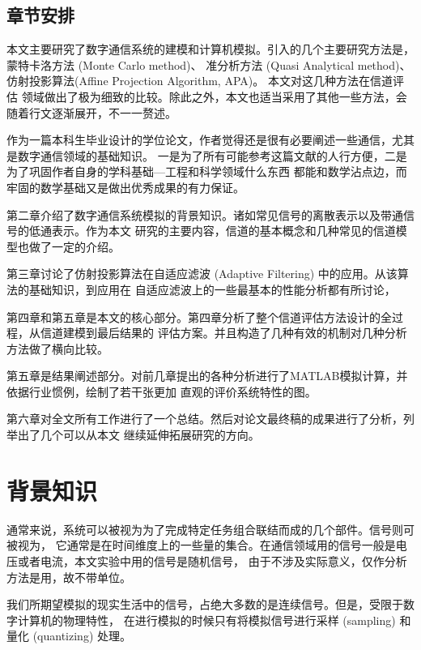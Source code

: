 \section{章节安排}\label{ChapterArrangement}
本文主要研究了数字通信系统的建模和计算机模拟。引入的几个主要研究方法是，蒙特卡洛方法 (Monte Carlo method)、
准分析方法 (Quasi Analytical method)、仿射投影算法(Affine Projection Algorithm, APA)。 本文对这几种方法在信道评估
领域做出了极为细致的比较。除此之外，本文也适当采用了其他一些方法，会随着行文逐渐展开，不一一赘述。
\par
作为一篇本科生毕业设计的学位论文，作者觉得还是很有必要阐述一些通信，尤其是数字通信领域的基础知识。
一是为了所有可能参考这篇文献的人行方便，二是为了巩固作者自身的学科基础---工程和科学领域什么东西
都能和数学沾点边，而牢固的数学基础又是做出优秀成果的有力保证。
\par
第二章介绍了数字通信系统模拟的背景知识。诸如常见信号的离散表示以及带通信号的低通表示。作为本文
研究的主要内容，信道的基本概念和几种常见的信道模型也做了一定的介绍。
\par
第三章讨论了仿射投影算法在自适应滤波 (Adaptive Filtering) 中的应用。从该算法的基础知识，到应用在
自适应滤波上的一些最基本的性能分析都有所讨论，
\par
第四章和第五章是本文的核心部分。第四章分析了整个信道评估方法设计的全过程，从信道建模到最后结果的
评估方案。并且构造了几种有效的机制对几种分析方法做了横向比较。
\par
第五章是结果阐述部分。对前几章提出的各种分析进行了MATLAB模拟计算，并依据行业惯例，绘制了若干张更加
直观的评价系统特性的图。
\par
第六章对全文所有工作进行了一个总结。然后对论文最终稿的成果进行了分析，列举出了几个可以从本文
继续延伸拓展研究的方向。

\chapter{背景知识}\label{FoundamentalKnowledge}
通常来说，系统可以被视为为了完成特定任务组合联结而成的几个部件。信号则可被视为，
它通常是在时间维度上的一些量的集合。在通信领域用的信号一般是电压或者电流，本文实验中用的信号是随机信号，
由于不涉及实际意义，仅作分析方法是用，故不带单位。
\par
我们所期望模拟的现实生活中的信号，占绝大多数的是连续信号。但是，受限于数字计算机的物理特性，
在进行模拟的时候只有将模拟信号进行采样 (sampling) 和量化 (quantizing) 处理。
